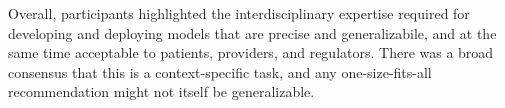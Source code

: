 Overall, participants highlighted the interdisciplinary expertise required for developing and deploying models that are precise and generalizabile, and at the same time acceptable to patients, providers, and regulators. There was a broad consensus that this is a context-specific task, and any one-size-fits-all recommendation might not itself be generalizable.
